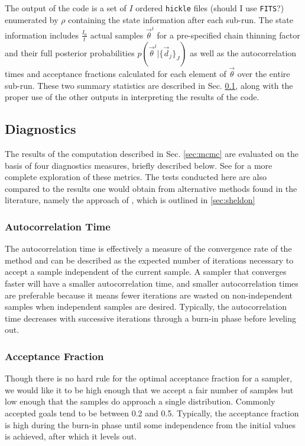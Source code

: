 \documentclass[preprint]{aastex}
\begin{document}
The output of the code is a set of $I$ ordered \texttt{hickle} files (should I use \texttt{FITS}?) enumerated by $\rho$ containing the state information after each sub-run.  The state information includes $\frac{I_{0}}{t}$ actual samples $\vec{\theta}^{i}$ for a pre-specified chain thinning factor and their full posterior probabilities $p(\vec{\theta}^{i}|\{\vec{d}_{j}\}_{J})$ as well as the autocorrelation times and acceptance fractions calculated for each element of $\vec{\theta}$ over the entire sub-run.  These two summary statistics are described in Sec. \ref{sec:diag}, along with the proper use of the other outputs in interpreting the results of the code.

\clearpage
\subsection{Diagnostics}
\label{sec:diag}

The results of the computation described in Sec. \ref{sec:mcmc} are evaluated on the basis of four diagnostics measures, briefly described below.  See \citet{for12} for a more complete exploration of these metrics.  The tests conducted here are also compared to the results one would obtain from alternative methods found in the literature, namely the approach of \citet{she11}, which is outlined in \ref{sec:sheldon}

\clearpage
\subsubsection{Autocorrelation Time}
\label{sec:acorr}

The autocorrelation time is effectively a measure of the convergence rate of the method and can be described as the expected number of iterations necessary to accept a sample independent of the current sample.  A sampler that converges faster will have a smaller autocorrelation time, and smaller autocorrelation times are preferable because it means fewer iterations are wasted on non-independent samples when independent samples are desired.  Typically, the autocorrelation time decreases with successive iterations through a burn-in phase before leveling out.

\clearpage
\subsubsection{Acceptance Fraction}
\label{sec:afrac}

Though there is no hard rule for the optimal acceptance fraction for a sampler, we would like it to be high enough that we accept a fair number of samples but low enough that the samples do approach a single distribution.  Commonly accepted goals tend to be between 0.2 and 0.5.  Typically, the acceptance fraction is high during the burn-in phase until some independence from the initial values is achieved, after which it levels out.
\end{document}

